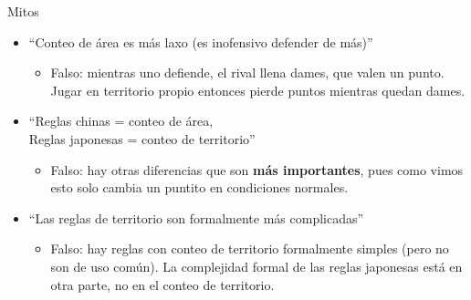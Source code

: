 \documentclass{beamer}
\begin{document}
\begin{frame}{Mitos}

    \begin{itemize}
        \item ``Conteo de área es más laxo (es inofensivo defender de más)''
          \begin{itemize}
             \item Falso: mientras uno defiende, el rival llena dames, que valen un punto. Jugar en territorio propio entonces pierde puntos mientras quedan dames.
          \end{itemize}
        \item ``Reglas chinas = conteo de área, \\Reglas japonesas = conteo de territorio''
          \begin{itemize}
             \item Falso: hay otras diferencias que son \textbf{más importantes}, pues como vimos esto solo cambia un puntito en condiciones normales.
          \end{itemize}
        \item ``Las reglas de territorio son formalmente más complicadas''
          \begin{itemize}
             \item Falso: hay reglas con conteo de territorio formalmente simples (pero no son de uso común). La complejidad formal de las reglas japonesas está en otra parte, no en el conteo de territorio.
          \end{itemize}
    \end{itemize}
  
\end{frame}
\end{document}
